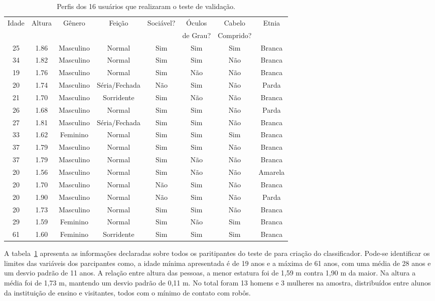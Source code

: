 \begin{table}[!ht]
	\caption{Perfis dos 16 usuários que realizaram o teste de validação.}
	\label{tab:perfilvalidacao}
	\centering
	\begin{tabular}{c | c | c | c | c | c | c | c}
        \hline
        Idade & Altura & Gênero & Feição & Sociável? & Óculos & Cabelo & Etnia \\
         &  &  &  &  & de Grau? & Comprido? &  \\ \hline
		 25 & 1.86 & Masculino & Normal & Sim & Sim & Sim & Branca \\ \hline
		 34 & 1.82 & Masculino & Normal & Sim & Sim & Não & Branca \\ \hline
		 19 & 1.76 & Masculino & Normal & Sim & Não & Não & Branca \\ \hline
		 20 & 1.74 & Masculino & Séria/Fechada & Não & Sim & Não & Parda \\ \hline
		 21 & 1.70 & Masculino & Sorridente & Sim & Não & Não & Branca \\ \hline
		 26 & 1.68 & Masculino & Normal & Sim & Sim & Não & Parda \\ \hline
		 27 & 1.81 & Masculino & Séria/Fechada & Sim & Sim & Não & Branca \\ \hline
		 33 & 1.62 & Feminino & Normal & Sim & Sim & Sim & Branca \\ \hline
		 37 & 1.79 & Masculino & Normal & Sim & Sim & Não & Branca \\ \hline
		 37 & 1.79 & Masculino & Normal & Sim & Não & Não & Branca \\ \hline
		 20 & 1.56 & Masculino & Normal & Sim & Não & Não & Amarela \\ \hline
		 20 & 1.70 & Masculino & Normal & Não & Sim & Não & Branca \\ \hline
		 20 & 1.90 & Masculino & Normal & Não & Sim & Não & Parda \\ \hline
		 20 & 1.73 & Masculino & Normal & Sim & Sim & Não & Branca \\ \hline
		 29 & 1.59 & Feminino & Normal & Sim & Não & Sim & Branca \\ \hline
		 61 & 1.60 & Feminino & Sorridente & Sim & Sim & Sim & Branca \\ \hline
	\end{tabular}
\end{table}

A tabela~\ref{tab:perfilvalidacao} apresenta as informações declaradas sobre todos os paritipantes do teste de para criação do classificador. Pode-se identificar os limites das variáveis dos parcipantes como, a idade mínima apresentada é de 19 anos e a máxima de 61 anos, com uma média de 28 anos e um desvio padrão de 11 anos. A relação entre altura das pessoas, a menor estatura foi de 1,59 m contra 1,90 m da maior. Na altura a média foi de 1,73 m, mantendo um desvio padrão de 0,11 m. No total foram 13 homens e 3 mulheres na amostra, distribuídos entre alunos da instituição de ensino e visitantes, todos com o mínimo de contato com robôs.

